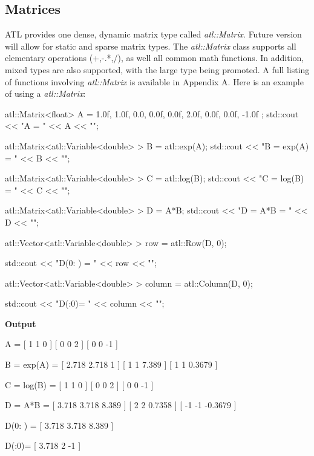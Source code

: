 \documentclass[12pt,a4paper]{article}
\begin{document}
\subsection{Matrices}
ATL provides one dense, dynamic matrix type called \textit{atl::Matrix}. Future version will allow for static and sparse matrix types. The \textit{atl::Matrix} class supports all elementary operations (+,-.*,/), as well all common math functions. In addition, mixed types are also supported, with the large type being promoted. A full listing of functions involving \textit{atl::Matrix} is available in Appendix A. Here is an example of using a \textit{atl::Matrix}:
\begin{cppsource}
    atl::Matrix<float> A = {
        {1.0f, 1.0f, 0.0},
        {0.0f, 0.0f, 2.0f},
        { 0.0f, 0.0f, -1.0f}
    };
    std::cout << "A = \n" << A << "\n";

    atl::Matrix<atl::Variable<double> > B = atl::exp(A);
    std::cout << "B = exp(A) = \n" << B << "\n";

    atl::Matrix<atl::Variable<double> > C = atl::log(B);
    std::cout << "C = log(B) = \n" << C << "\n";

    atl::Matrix<atl::Variable<double> > D = A*B;
    std::cout << "D = A*B = \n" << D << "\n";

    atl::Vector<atl::Variable<double> > row = atl::Row(D, 0);

    std::cout << "D(0: ) = " << row << "\n";

    atl::Vector<atl::Variable<double> > column = atl::Column(D, 0);

    std::cout << "D(:0)= " << column << "\n";
      
\end{cppsource}
\textbf{Output}
\begin{myoutput}

A = 
[       1       1       0 ]
[       0       0       2 ]
[       0       0      -1 ]

B = exp(A) = 
[   2.718   2.718       1 ]
[       1       1   7.389 ]
[       1       1  0.3679 ]

C = log(B) = 
[       1       1       0 ]
[       0       0       2 ]
[       0       0      -1 ]

D = A*B = 
[   3.718   3.718   8.389 ]
[       2       2  0.7358 ]
[      -1      -1 -0.3679 ]

D(0: ) = [ 3.718 3.718 8.389 ]

D(:0)= [ 3.718 2 -1 ]


\end{myoutput}
\end{document}
